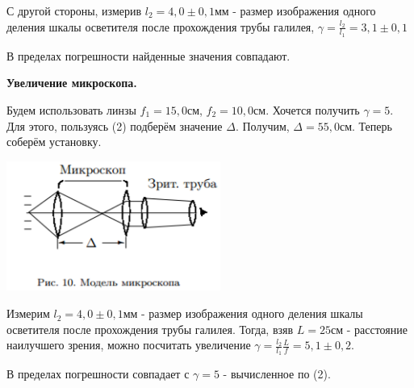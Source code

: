 \documentclass[12pt]{article}
\begin{document}
    С другой стороны, измерив $l_2 = 4,0 \pm 0,1 мм$ - размер изображения одного деления шкалы осветителя после прохождения трубы галилея, $\gamma = \frac{l_2}{l_1} = 3,1 \pm 0,1$
    
    В пределах погрешности найденные значения совпадают.
    
    \textbf{Увеличение микроскопа.}
    
    Будем использовать линзы $f_1 = 15,0 см$, $f_2 = 10,0см$. Хочется получить $\gamma = 5$. Для этого, пользуясь (2) подберём значение $\Delta$. Получим, $\Delta = 55,0 см$. Теперь соберём установку.
    
    \includegraphics[width=7cm]{micro.png}
    
    Измерим $l_2 = 4,0 \pm 0,1 мм$ - размер изображения одного деления шкалы осветителя после прохождения трубы галилея. Тогда, взяв $L = 25 см$ - расстояние наилучшего зрения, можно посчитать увеличение $\gamma = \frac{l_2}{l_1}\frac{L}{f} = 5,1 \pm 0,2$.
    
    В пределах погрешности совпадает с $\gamma = 5$ - вычисленное по (2).
    
\end{document}
